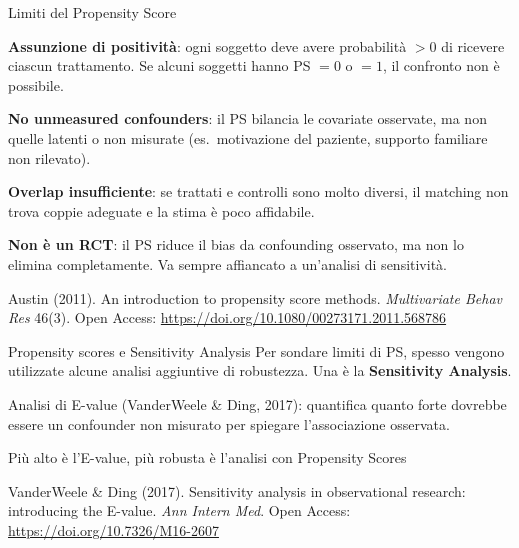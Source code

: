 \documentclass[
  ignorenonframetext,
]{beamer}
\begin{document}
\begin{frame}{Limiti del Propensity Score}
\label{limiti-del-propensity-score}
\small

\textbf{Assunzione di positività}: ogni soggetto deve avere probabilità
\(> 0\) di ricevere ciascun trattamento. Se alcuni soggetti hanno PS
\(= 0\) o \(= 1\), il confronto non è possibile.

\vspace{0.3em}

\textbf{No unmeasured confounders}: il PS bilancia le covariate
osservate, ma non quelle latenti o non misurate (es.~motivazione del
paziente, supporto familiare non rilevato).

\vspace{0.3em}

\textbf{Overlap insufficiente}: se trattati e controlli sono molto
diversi, il matching non trova coppie adeguate e la stima è poco
affidabile.

\vspace{0.3em}

\textbf{Non è un RCT}: il PS riduce il bias da confounding osservato, ma
non lo elimina completamente. Va sempre affiancato a un'analisi di
sensitività.

\vspace{0.2em}

\tiny Austin (2011). An introduction to propensity score methods.
\emph{Multivariate Behav Res} 46(3). Open Access:
\url{https://doi.org/10.1080/00273171.2011.568786}
\end{frame}

\begin{frame}{Propensity scores e Sensitivity Analysis}
\label{propensity-scores-e-sensitivity-analysis}
Per sondare limiti di PS, spesso vengono utilizzate alcune analisi
aggiuntive di robustezza. Una è la \textbf{Sensitivity Analysis}.

Analisi di E-value (VanderWeele \& Ding, 2017): quantifica quanto forte
dovrebbe essere un confounder non misurato per spiegare l'associazione
osservata.

Più alto è l'E-value, più robusta è l'analisi con Propensity Scores

\vspace{0.2em}

\tiny VanderWeele \& Ding (2017). Sensitivity analysis in observational
research: introducing the E-value. \emph{Ann Intern Med}. Open Access:
\url{https://doi.org/10.7326/M16-2607}
\end{frame}
\end{document}
